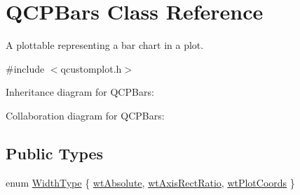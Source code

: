 \hypertarget{class_q_c_p_bars}{}\section{Q\+C\+P\+Bars Class Reference}
\label{class_q_c_p_bars}


A plottable representing a bar chart in a plot.  




{\ttfamily \#include $<$qcustomplot.\+h$>$}



Inheritance diagram for Q\+C\+P\+Bars\+:


Collaboration diagram for Q\+C\+P\+Bars\+:
\subsection*{Public Types}
\begin{DoxyCompactItemize}
\item 
enum \hyperlink{class_q_c_p_bars_a65dbbf1ab41cbe993d71521096ed4649}{Width\+Type} \{ \hyperlink{class_q_c_p_bars_a65dbbf1ab41cbe993d71521096ed4649ab74315c9aa77df593c58dd25dfc0de35}{wt\+Absolute}, 
\hyperlink{class_q_c_p_bars_a65dbbf1ab41cbe993d71521096ed4649a90bc09899361ad3422ff277f7c790ffe}{wt\+Axis\+Rect\+Ratio}, 
\hyperlink{class_q_c_p_bars_a65dbbf1ab41cbe993d71521096ed4649aad3cc60ae1bfb1160a30237bee9eaf10}{wt\+Plot\+Coords}
 \}
\end{DoxyCompactItemize}
